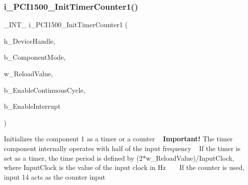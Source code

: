 \subsubsection{\texorpdfstring{i\_PCI1500\_InitTimerCounter1()}{i\_PCI1500\_InitTimerCounter1()}}
{\footnotesize\ttfamily \+\_\+\+I\+N\+T\+\_\+ i\+\_\+\+P\+C\+I1500\+\_\+\+Init\+Timer\+Counter1 (\begin{DoxyParamCaption}\item[{H\+A\+N\+D\+LE}]{h\+\_\+\+Device\+Handle,  }\item[{B\+Y\+TE}]{b\+\_\+\+Component\+Mode,  }\item[{W\+O\+RD}]{w\+\_\+\+Reload\+Value,  }\item[{B\+Y\+TE}]{b\+\_\+\+Enable\+Continuous\+Cycle,  }\item[{B\+Y\+TE}]{b\+\_\+\+Enable\+Interrupt }\end{DoxyParamCaption})}

Initializes the component 1 as a timer or a counter ~\newline
 {\bfseries{Important!}} The timer component internally operates with half of the input frequency ~\newline
 If the timer is set as a timer, the time period is defined by (2$\ast$w\+\_\+\+Reload\+Value)/\+Input\+Clock, where Input\+Clock is the value of the input clock in Hz ~\newline
 ~\newline
 If the counter is used, input 14 acts as the counter input


